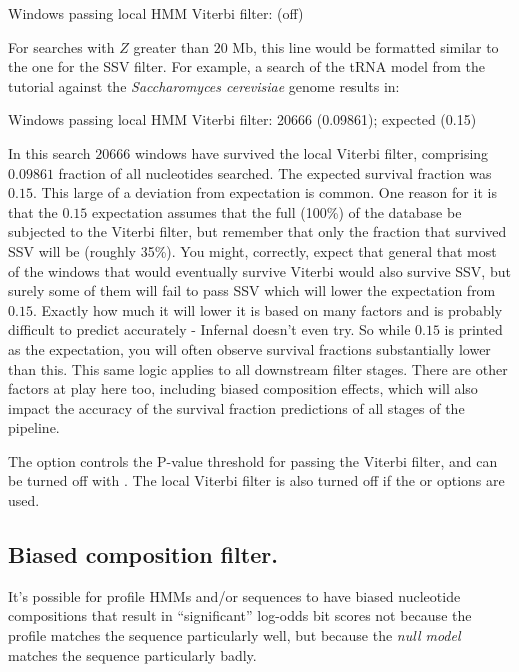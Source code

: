 \begin{sreoutput}
Windows   passing  local HMM Viterbi       filter:                  (off)

For searches with $Z$ greater than $20$ Mb, this line would be
formatted similar to the one for the SSV filter. For example,
a search of the tRNA model from the tutorial against the
\emph{Saccharomyces cerevisiae} genome results in:

\begin{sreoutput}
Windows   passing  local HMM Viterbi       filter:           20666  (0.09861); expected (0.15)
\end{sreoutput}

In this search $20666$ windows have survived the local Viterbi filter,
comprising $0.09861$ fraction of all nucleotides searched. The expected
survival fraction was $0.15$. This large of a deviation from
expectation is common. One reason for it is that the $0.15$
expectation assumes that the full (100\%) of the database be subjected
to the Viterbi filter, but remember that only the fraction that
survived SSV will be (roughly 35\%). You might, correctly, expect that 
general that most of the windows that would eventually survive Viterbi would also
survive SSV, but surely some of them will fail to pass SSV which will
lower the expectation from $0.15$. Exactly how much it will lower it
is based on many factors and is probably difficult to predict
accurately - Infernal doesn't even try. So while $0.15$ is printed as
the expectation, you will often observe survival fractions
substantially lower than this. This same logic applies to all
downstream filter stages. There are other factors at play here
too, including biased composition effects, which will also impact the
accuracy of the survival fraction predictions of all stages of the
pipeline. 

The  option controls the P-value threshold for passing
the Viterbi filter, and can be turned off with .  The
local Viterbi filter is also turned off if the  or
 options are used.

\subsection{Biased composition filter.}

It's possible for profile HMMs and/or sequences to have biased nucleotide
compositions that result in ``significant'' log-odds bit scores not
because the profile matches the sequence particularly well, but
because the \emph{null model} matches the sequence particularly badly.


\end{sreoutput}
